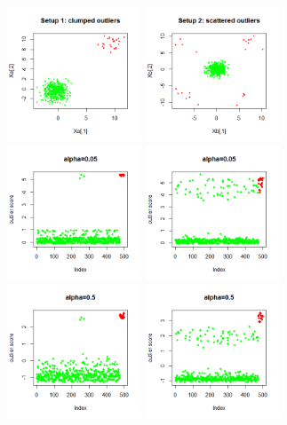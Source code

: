 \documentclass[10pt]{article}
\begin{document}
\begin{figure}[h]
	\centering
		\includegraphics[height=4cm]{outlier_sim11.png}
		\includegraphics[height=4cm]{outlier_sim21.png}\\
		\includegraphics[height=4cm]{outlier_sim12.png}
		\includegraphics[height=4cm]{outlier_sim22.png}\\
		\includegraphics[height=4cm]{outlier_sim13.png}
		\includegraphics[height=4cm]{outlier_sim23.png}\\

\end{figure}
\end{document}
